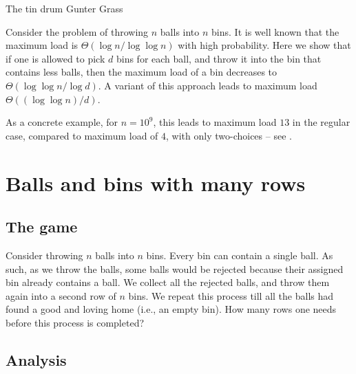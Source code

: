 \makeatletter
{}
\makeatother
\ifx\bookMode\undefined%
\fi
{}

\ChapterPrefix{}%
\ChapterGen{}


%
{The tin drum}%
{Gunter Grass}%

\bigskip%
\noindent%
Consider the problem of throwing $n$ balls into $n$ bins. It is well
known that the maximum load is $\Theta( \log n / \log \log n)$ with
high probability. Here we show that if one is allowed to pick $d$ bins
for each ball, and throw it into the bin that contains less balls,
then the maximum load of a bin decreases to
$\Theta( \log \log n/ \log d)$. A variant of this approach leads to
maximum load $\Theta( (\log \log n)/ d)$.

As a concrete example, for $n=10^9$, this leads to maximum load $13$
in the regular case, compared to maximum load of $4$, with only
two-choices -- see .




\section{Balls and bins with many rows}
%

\subsection{The game}

Consider throwing $n$ balls into $n$ bins. Every bin can contain a
single ball. As such, as we throw the balls, some balls would be
rejected because their assigned bin already contains a ball. We
collect all the rejected balls, and throw them again into a second row
of $n$ bins. We repeat this process till all the balls had found a
good and loving home (i.e., an empty bin). How many rows one needs
before this process is completed?

\subsection{Analysis}

